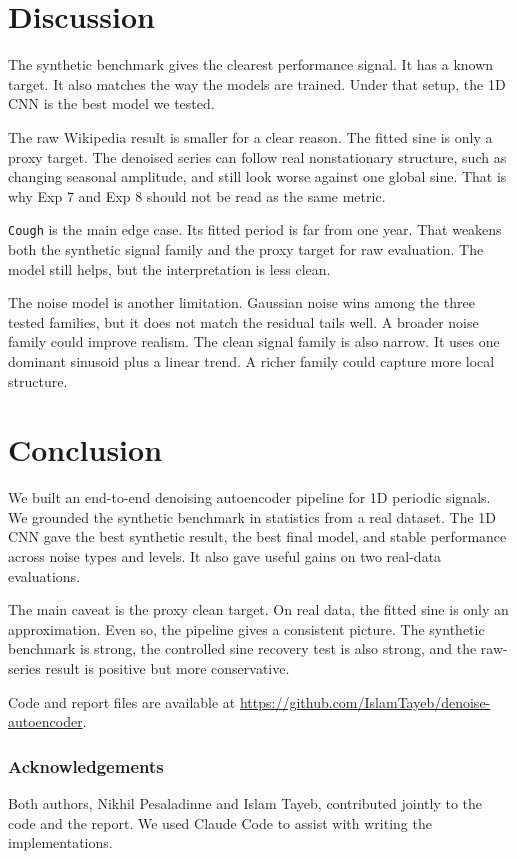 \documentclass{article}
\begin{document}
\section{Discussion}

The synthetic benchmark gives the clearest performance signal. It has a known target. It also matches the way the models are trained. Under that setup, the 1D CNN is the best model we tested.

The raw Wikipedia result is smaller for a clear reason. The fitted sine is only a proxy target. The denoised series can follow real nonstationary structure, such as changing seasonal amplitude, and still look worse against one global sine. That is why Exp 7 and Exp 8 should not be read as the same metric.

\texttt{Cough} is the main edge case. Its fitted period is far from one year. That weakens both the synthetic signal family and the proxy target for raw evaluation. The model still helps, but the interpretation is less clean.

The noise model is another limitation. Gaussian noise wins among the three tested families, but it does not match the residual tails well. A broader noise family could improve realism. The clean signal family is also narrow. It uses one dominant sinusoid plus a linear trend. A richer family could capture more local structure.

\section{Conclusion}

We built an end-to-end denoising autoencoder pipeline for 1D periodic signals. We grounded the synthetic benchmark in statistics from a real dataset. The 1D CNN gave the best synthetic result, the best final model, and stable performance across noise types and levels. It also gave useful gains on two real-data evaluations.

The main caveat is the proxy clean target. On real data, the fitted sine is only an approximation. Even so, the pipeline gives a consistent picture. The synthetic benchmark is strong, the controlled sine recovery test is also strong, and the raw-series result is positive but more conservative.

Code and report files are available at \url{https://github.com/IslamTayeb/denoise-autoencoder}.

\subsubsection*{Acknowledgements}

Both authors, Nikhil Pesaladinne and Islam Tayeb, contributed jointly to the code and the report. We used Claude Code to assist with writing the implementations.



\end{document}
